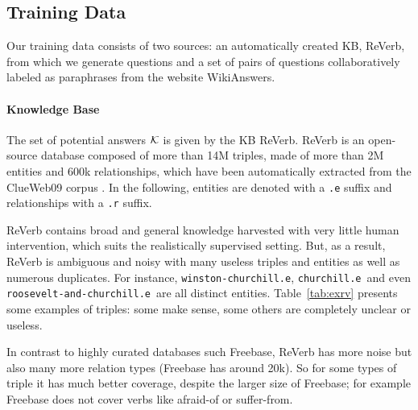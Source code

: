 \documentclass[runningheads,a4paper]{llncs}
\newcommand{\kb}[1]{{\small\texttt{#1}}\xspace}
\newcommand{\fb}{{\sc Freebase}\xspace}
\newcommand{\rv}{{\sc ReVerb}\xspace}
\newcommand{\wk}{{\sc WikiAnswers}\xspace}
\begin{document}
\subsection{Training Data}

Our training data consists of two sources: an automatically created KB, \rv,  from which we generate questions and a set of pairs of questions collaboratively labeled as paraphrases from the website \wk.


\paragraph{Knowledge Base}
The set of potential answers ${\cal K}$ is given by the KB \rv \cite{ReVerb2011}.
\rv is an open-source database composed of more than 14M triples, made of more 
than 2M entities and 600k relationships, which have been automatically extracted from 
the ClueWeb09 corpus \cite{pomikalek2012building}. In the following, entities are denoted with a \kb{.e} suffix and relationships with a \kb{.r} suffix. 

\rv contains broad and general knowledge harvested with very little human intervention, which suits the realistically supervised setting. 
But, as a result, \rv is ambiguous and noisy with many useless triples and entities as well as numerous duplicates. For instance, \kb{winston-churchill.e}, \kb{churchill.e} and even \kb{roosevelt-and-churchill.e} are all distinct entities.
Table~\ref{tab:exrv} presents some examples of triples: some make sense, some others are completely unclear or useless. 

In contrast to highly curated databases such \fb, \rv has more noise but also many more relation types (\fb has around 20k). So for some types of triple it has much better coverage, despite the larger size of \fb; for example \fb does not cover verbs like afraid-of or suffer-from.
\end{document}
